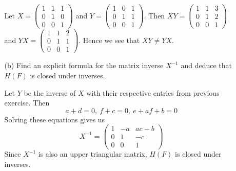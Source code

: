 \documentclass[12pt]{article}
\begin{document}
\begin{enumerate}
\begin{enumerate}
\begin{mybox}
                \vspace*{2mm}
                Let $X=\left(\begin{array}{ccc}
                    1 & 1 & 1\\
                    0 & 1 & 0\\
                    0 & 0 & 1 \end{array}
                    \right)$ and
                    $Y=\left(\begin{array}{ccc}
                        1 & 0 & 1\\
                        0 & 1 & 1\\
                        0 & 0 & 1 \end{array}
                    \right)$. Then
                    $XY=\left(\begin{array}{ccc}
                        1 & 1 & 3\\
                        0 & 1 & 2\\
                        0 & 0 & 1 \end{array}
                    \right)$ and
                    $YX=\left(\begin{array}{ccc}
                        1 & 1 & 2\\
                        0 & 1 & 1\\
                        0 & 0 & 1 \end{array}
                    \right)$. Hence we see that
                    $XY\neq YX$.
        \end{mybox}

        \item[(b)] Find an explicit formula for the matrix
        inverse $X^{-1}$ and deduce that $H(F)$ is closed
        under inverses.
        \begin{mybox}
            
            Let $Y$ be the inverse of $X$ with
            their respective entries from previous
            exercise. Then
            $$a+d=0,\ f+c=0, \ e+af+b=0$$
            Solving these equations gives us
            $$X^{-1}=\left(\begin{array}{ccc}
                1 & -a & ac-b\\
                0 & 1 & -c\\
                0 & 0 & 1 \end{array}
                \right)$$
            Since $X^{-1}$ is also an upper triangular
            matrix, $H(F)$ is closed under inverses.
        \end{mybox}


\end{enumerate}
\end{enumerate}
\end{document}
